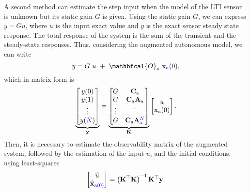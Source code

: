 A second method can estimate the step input when the model of the LTI sensor is unknown but its static gain $G$ is given.
Using the static gain $G$, we can express ${{y}} = G {{u}}$, where ${{u}}$ is the input exact value and ${{y}}$ is the \color{blue} exact \color{black} sensor steady state response.
The total response of the system is the sum of the transient and the steady-state responses.
Thus, considering the augmented autonomous model, we can write
\begin{equation} {y} = G \ {{u}} \ + \ \mathbfcal{O}_\text{a} \ \mathbf{x}_{\color{blue}\text{a}\color{black}}(0) , \end{equation}
\color{blue} which \color{black} in matrix form is
\begin{equation} \underbrace{ \begin{bmatrix}y(0) \\ y(1) \\ \vdots \\ y(\color{blue}N\color{black}) \end{bmatrix}}_{\mathbf{y}} = \underbrace{ \begin{bmatrix} G & \mathbf{C}_\text{a} \\ G & \mathbf{C}_\text{a} \mathbf{A}_\text{a} \\ \vdots & \vdots \\ G & \mathbf{C}_\text{a} \mathbf{A}_\text{a}^{\color{blue}N\color{black}} \end{bmatrix}}_{\mathbf{K}} \begin{bmatrix} {{u}} \\ \mathbf{x}_{\color{blue}\text{a}\color{black}}(0) \end{bmatrix} .\end{equation}
Then, it is necessary to estimate the observability matrix of the augmented system, followed by the estimation of the input  ${u}$, and the initial conditions, using least-squares
\begin{equation} \begin{bmatrix} \widehat{{u}} \\ \widehat{\mathbf{x}}_{\color{blue}\text{a}(0)\color{black}} \end{bmatrix} = \left( \mathbf{K}^\top \mathbf{K} \right)^{-1} \mathbf{K}^\top \mathbf{y}. \end{equation}



